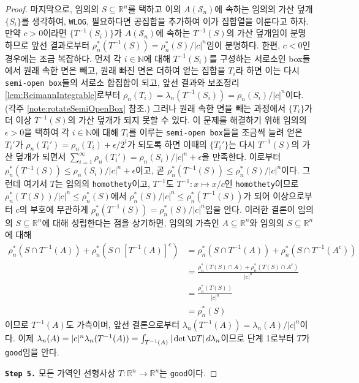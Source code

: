\begin{proof}
    마지막으로, 임의의 $S\subseteq\mathbb{R}^n$를 택하고 이의 $A(\mathcal{S}_n)$에 속하는 임의의 가산 덮개 $\{S_i\}$를 생각하여, \texttt{WLOG}, 필요하다면 공집합을 추가하여 이가 집합열을 이룬다고 하자. 만약 $c>0$이라면 $\{T^{-1}(S_i)\}$가 $A(\mathcal{S}_n)$에 속하는 $T^{-1}(S)$의 가산 덮개임이 분명하므로 앞선 결과로부터 $\rho_n^*(T^{-1}(S))=\rho_n^*(S)/|c|^n$임이 분명하다. 한편, $c<0$인 경우에는 조금 복잡하다. 먼저 각 $i\in\mathbb{N}$에 대해 $T^{-1}(S_i)$를 구성하는 서로소인 box들에서 원래 속한 면은 빼고, 원래 빠진 면은 더하여 얻는 집합을 $T_i$라 하면 이는 다시 \texttt{semi-open box}들의 서로소 합집합이 되고, 앞선 결과와 보조정리 \ref{lem:ReimannIntegrable}로부터 $\rho_n(T_i)=\lambda_n(T^{-1}(S_i))=\rho_n(S_i)/|c|^n$이다. (각주 \ref{note:rotateSemiOpenBox} 참조.) 그러나 원래 속한 면을 빼는 과정에서 $\{T_i\}$가 더 이상 $T^{-1}(S)$의 가산 덮개가 되지 못할 수 있다. 이 문제를 해결하기 위해 임의의 $\epsilon>0$을 택하여 각 $i\in\mathbb{N}$에 대해 $T_i$를 이루는 \texttt{semi-open box}들을 조금씩 늘려 얻은 $T_i'$가 $\rho_n(T_i')=\rho_n(T_i)+\epsilon/2^i$가 되도록 하면 이때의 $\{T_i'\}$는 다시 $T^{-1}(S)$의 가산 덮개가 되면서 $\sum_{i=1}^\infty\rho_n(T_i')=\rho_n(S_i)/|c|^n+\epsilon$을 만족한다. 이로부터 $\rho_n^*(T^{-1}(S))\leq\rho_n(S_i)/|c|^n+\epsilon$이고, 곧 $\rho_n^*(T^{-1}(S))\leq\rho_n^*(S)/|c|^n$이다. 그런데 여기서 $T$는 임의의 \texttt{homothety}이고, $T^{-1}$도 $T^{-1}:x\mapsto x/c$인 \texttt{homothety}이므로 $\rho_n^*(T(S))/|c|^n\leq\rho_n^*(S)$에서 $\rho_n^*(S)/|c|^n\leq\rho_n^*(T^{-1}(S))$가 되어 이상으로부터 $c$의 부호에 무관하게 $\rho_n^*(T^{-1}(S))=\rho_n^*(S)/|c|^n$임을 안다. 이러한 결론이 임의의 $S\subseteq\mathbb{R}^n$에 대해 성립한다는 점을 상기하면, 임의의 가측인 $A\subseteq\mathbb{R}^n$와 임의의 $S\subseteq\mathbb{R}^n$에 대해
    \begin{align*}
        \rho_n^*(S\cap T^{-1}(A))+\rho_n^*(S\cap [T^{-1}(A)]^c)&=\rho_n^*(S\cap T^{-1}(A))+\rho_n^*(S\cap T^{-1}(A^c))\\
        &=\frac{\rho_n^*(T(S)\cap A)+\rho_n^*(T(S)\cap A^c)}{|c|^n}\\
        &=\frac{\rho_n^*(T(S))}{|c|^n}\\
        &=\rho_n^*(S)
    \end{align*}
    이므로 $T^{-1}(A)$도 가측이며, 앞선 결론으로부터 $\lambda_n(T^{-1}(A))=\lambda_n(A)/|c|^n$이다. 이제 $\lambda_n(A)=|c|^n\lambda_n(T^{-1}(A))=\int_{T^{-1}(A)}|\det\D T|\,d\lambda_n$이므로 단계 1로부터 $T$가 \texttt{good}임을 안다.

    \noindent\texttt{\textbf{Step 5.}} 모든 가역인 선형사상 $T:\mathbb{R}^n\to\mathbb{R}^n$는 \texttt{good}이다.


\end{proof}
